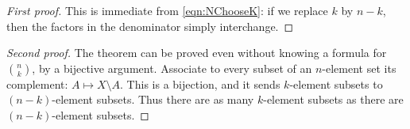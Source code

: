 \begin{proof}[First proof]
This is immediate from \eqref{eqn:NChooseK}: if we replace $k$ by $n-k$, then the factors in the denominator simply interchange.
\end{proof}
\begin{proof}[Second proof]
The theorem can be proved even without knowing a formula for $\binom{n}{k}$, by a bijective argument.
Associate to every subset of an $n$-element set its complement: $A \mapsto X \setminus A$.
This is a bijection, and it sends $k$-element subsets to $(n-k)$-element subsets.
Thus there are as many $k$-element subsets as there are $(n-k)$-element subsets.
\end{proof}
